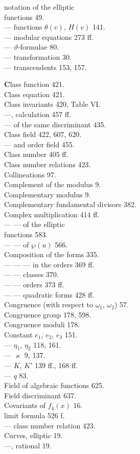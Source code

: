 
\noindent
\begin{minipage}[t]{0.48\textwidth}
\noindent {} notation of the elliptic\\
functions 49.\\
--- functions $\theta(v)$, $H(v)$ 141.\\
--- modular equations 273 ff.\\
--- $\vartheta$-formulae 80.\\
--- transformation 30.\\
--- transcendents 153, 157.

\noindent \textbf{C}lass function 421.\\
Class equation 421.\\
Class invariants 420, Table VI.\\
---, calculation 457 ff.\\
--- of the same discriminant 435.\\
Class field 422, 607, 620.\\
--- and order field 455.\\
Class number 405 ff.\\
Class number relations 423.\\
Collineations 97.\\
Complement of the modulus 9.\\
Complementary modulus 9.\\
Complementary fundamental divisors 382.\\
Complex multiplication 414 ff.\\
--- --- of the  elliptic\\
functions 583.\\
--- --- of $\wp(u)$ 566.\\
Composition of the forms 335.\\
--- --- --- in the orders 369 ff.\\
--- --- classes 370.\\
--- --- orders 373 ff.\\
--- --- quadratic forms 428 ff.\\
Congruence (with respect to $\omega_1$, $\omega_2$) 57.\\
Congruence group 178, 598.\\
Congruence moduli 178.\\
Constant $e_1$, $e_2$, $e_3$ 151.\\
--- $\eta_1$, $\eta_2$ 118, 161.\\
--- $\varkappa$ 9, 137.\\
--- $K$, $K'$ 139 ff., 168 ff.\\
--- $q$ 83.\\
Field of algebraic functions 625.\\
Field discriminant 637.\\
Covariants of $f_4(x)$ 16.\\
 limit formula 526 f.\\
--- class number relation 423.\\
Curves, elliptic 19.\\
---, rational 19.


\end{minipage}
